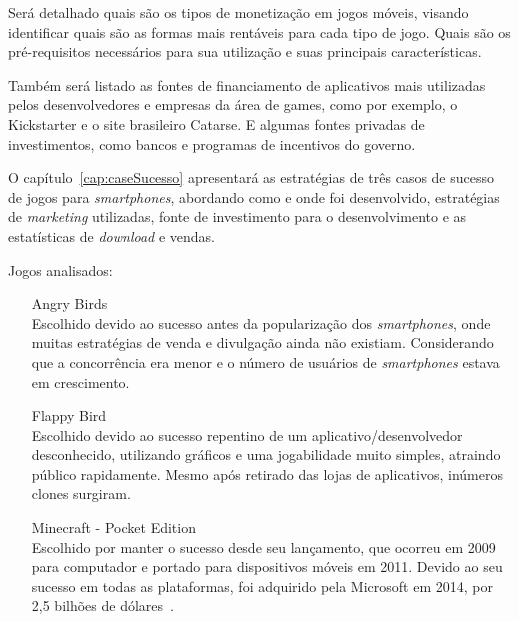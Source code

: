 Será detalhado quais são os tipos de monetização em jogos móveis, visando identificar quais são as formas mais rentáveis para cada tipo de jogo. Quais são os pré-requisitos necessários para sua utilização e suas principais características.


Também será listado as fontes de financiamento de aplicativos mais utilizadas pelos desenvolvedores e empresas da área de games, como por exemplo, o Kickstarter\cite{kickstarter} e o site brasileiro Catarse\cite{catarse}. E algumas fontes privadas de investimentos, como bancos e programas de incentivos do governo.






O capítulo~\ref{cap:caseSucesso} apresentará as estratégias de três casos de sucesso de jogos para \emph{smartphones}, abordando como e onde foi desenvolvido, estratégias de \emph{marketing} utilizadas, fonte de investimento para o desenvolvimento e as estatísticas de \emph{download} e vendas.\newline

Jogos analisados:

\begin{itemize}

	\item [Angry Birds~\cite{angrybirds}] \hfill \\
		Escolhido devido ao sucesso antes da popularização dos \emph{smartphones}, onde muitas estratégias de venda e divulgação ainda não existiam. Considerando que a concorrência era menor e o número de usuários de \emph{smartphones} estava em crescimento.

	\item [Flappy Bird~\cite{flappybird}] \hfill \\
		Escolhido devido ao sucesso repentino de um aplicativo/desenvolvedor desconhecido, utilizando gráficos e uma jogabilidade muito simples, atraindo público rapidamente. Mesmo após retirado das lojas de aplicativos, inúmeros clones surgiram.

	\item [Minecraft - Pocket Edition~\cite{minecraft}] \hfill \\
		Escolhido por manter o sucesso desde seu lançamento, que ocorreu em 2009 para computador e portado para dispositivos móveis em 2011. Devido ao seu sucesso em todas as plataformas, foi adquirido pela Microsoft em 2014, por 2,5 bilhões de dólares~\cite{minecraft-bought}.
	
	

\end{itemize}





